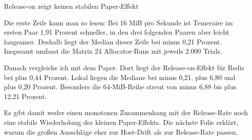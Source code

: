 \documentclass[aspectratio=169,10pt]{beamer}
\begin{document}
\begin{frame}{Release-on zeigt keinen stabilen Paper-Effekt}
{  \par\medskip
  Die erste Zeile kann man so lesen: Bei 16 MiB pro Sekunde ist Temeraire im ersten Paar 1,91 Prozent schneller, in den drei folgenden Paaren aber leicht langsamer. Deshalb liegt der Median dieser Zeile bei minus 0,21 Prozent. Insgesamt umfasst die Matrix 24 Allocator-Runs mit jeweils 2.000 Trials.
  
  \par\medskip
  Danach vergleiche ich mit dem Paper. Dort liegt der Release-on-Effekt für Redis bei plus 0,44 Prozent. Lokal liegen die Mediane bei minus 0,21, plus 6,80 und plus 0,20 Prozent. Besonders die 64-MiB-Reihe streut von minus 6,88 bis plus 12,21 Prozent.
  
  \par\medskip
  Es gibt damit weder einen monotonen Zusammenhang mit der Release-Rate noch eine stabile Wiederholung des kleinen Paper-Effekts. Die nächste Folie erklärt, warum die großen Ausschläge eher zur Host-Drift als zur Release-Rate passen.
}
\end{frame}
\end{document}
